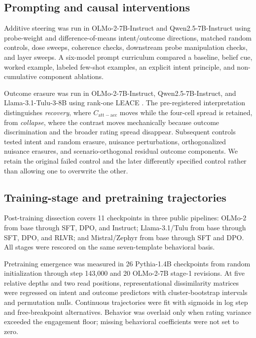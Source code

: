 \documentclass[11pt]{article}
\newcommand{\contrast}{C_{\mathrm{att-acc}}}
\begin{document}
\subsection{Prompting and causal interventions}

Additive steering was run in OLMo-2-7B-Instruct and Qwen2.5-7B-Instruct using probe-weight and difference-of-means intent/outcome directions, matched random controls, dose sweeps, coherence checks, downstream probe manipulation checks, and layer sweeps.
A six-model prompt curriculum compared a baseline, belief cue, worked example, labeled few-shot examples, an explicit intent principle, and non-cumulative component ablations.

Outcome erasure was run in OLMo-2-7B-Instruct, Qwen2.5-7B-Instruct, and Llama-3.1-Tulu-3-8B using rank-one LEACE \citep{belrose2023leace}.
The pre-registered interpretation distinguishes \emph{recovery}, where $\contrast$ moves while the four-cell spread is retained, from \emph{collapse}, where the contrast moves mechanically because outcome discrimination and the broader rating spread disappear.
Subsequent controls tested intent and random erasure, nuisance perturbations, orthogonalized nuisance erasures, and scenario-orthogonal residual outcome components.
We retain the original failed control and the later differently specified control rather than allowing one to overwrite the other.

\subsection{Training-stage and pretraining trajectories}

Post-training dissection covers 11 checkpoints in three public pipelines:
OLMo-2 from base through SFT, DPO, and Instruct;
Llama-3.1/Tulu from base through SFT, DPO, and RLVR;
and Mistral/Zephyr from base through SFT and DPO.
All stages were rescored on the same seven-template behavioral basis.

Pretraining emergence was measured in 26 Pythia-1.4B checkpoints from random initialization through step 143{,}000 and 20 OLMo-2-7B stage-1 revisions.
At five relative depths and two read positions, representational dissimilarity matrices were regressed on intent and outcome predictors with cluster-bootstrap intervals and permutation nulls.
Continuous trajectories were fit with sigmoids in log step and free-breakpoint alternatives.
Behavior was overlaid only when rating variance exceeded the engagement floor; missing behavioral coefficients were not set to zero.
\end{document}
